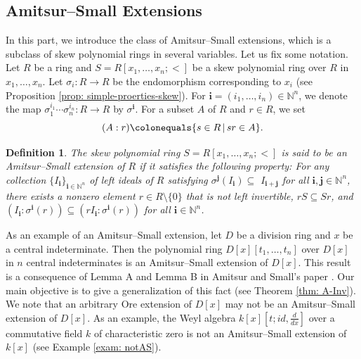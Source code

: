 \documentclass[11pt,a4paper]{article}
\theoremstyle{theorem}
\newtheorem{definition}{Definition}[section]
\numberwithin{equation}{section}
\newcommand{\s}{\sigma}
\begin{document}
	\subsection{Amitsur--Small Extensions}
	In this part, we introduce the class of Amitsur--Small extensions, which is a subclass of skew polynomial rings in several variables. Let us fix some notation. Let $R$ be a ring and  $S=R[x_1,\dots,x_n;<]$ be a skew polynomial ring over $R$ in $x_1,\dots,x_n$. Let $\s_i:R\to R$ be the endomorphism corresponding to $x_i$ (see Proposition \ref{prop: simple-proerties-skew}). For  $\mathbf{i}=(i_1,\dots,i_n)\in\mathbb{N}^n$, we denote the map $\s_1^{i_1}\cdots \s_n^{i_n}:R\to R$ by $\s^{\mathbf{i}}$. For a subset \(A\) of \(R\) and \(r\in R\), we set 
	\[
		(A:r)\colonequals\{s\in R\,|\,sr\in A \}.
	\]
		\begin{definition}\label{def: amitsur-small-extensions}
			The skew polynomial ring $S=R[x_1,\dots,x_n;<]$ is said to be an \emph{Amitsur--Small extension} of $R$ if it satisfies the following property:
			For any collection $\{I_{\mathbf{i}}\}_{\mathbf{i}\in \mathbb{N}^n}$ of left ideals of $R$ satisfying  $\s^{\mathbf{j}}({I}_{\mathbf{i}})\subseteq $  $I_{\mathbf{i+j}}$ for all $\mathbf{i},\mathbf{j}\in \mathbb{N}^n$, there exists a nonzero element $r\in R\setminus\{0\}$ that  is not left invertible, 
			$rS\subseteq Sr$, and 
			\((I_{\mathbf{i}}:\s^{\mathbf{i}}(r))\subseteq (rI_{\mathbf{i}}:\s^{\mathbf{i}}(r))\) for all $\mathbf{i}\in \mathbb{N}^n$. 
		\end{definition}
		As an example of an Amitsur--Small extension, let $D$ be a division ring and $x$ be a central indeterminate. Then  the polynomial ring $D[x][t_1,\dots,t_n]$ over $D[x]$  in $n$  central indeterminates is an Amitsur--Small extension of $D[x]$. This result is a consequence of Lemma A and Lemma B  in Amitsur and Small's paper \cite{AmitsurSmall}. Our main objective is to give a generalization of this fact (see Theorem \ref{thm: A-Inv}). We note that an arbitrary Ore extension of $D[x]$ may not be  an Amitsur--Small extension of $D[x]$. As an example, 	the Weyl algebra $k[x][t;id,\frac{d}{d x}]$ over a commutative field $k$  of characteristic zero  is not an Amitsur--Small extension of	$k[x]$ (see Example \ref{exam: notAS}).
		
\end{document}
